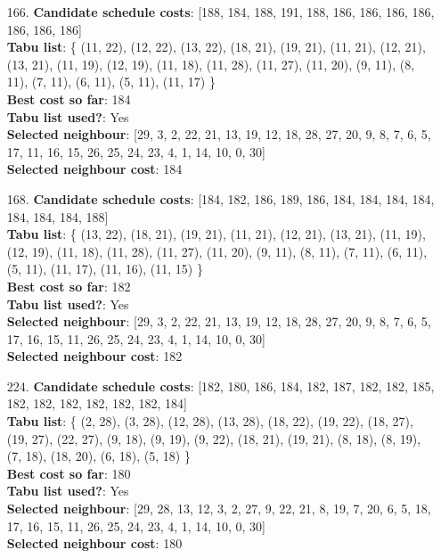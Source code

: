 \documentclass[fleqn]{article}
\begin{document}
\begin{itemize}
    \item[166.] \textbf{Candidate schedule costs}: [188, 184, 188, 191, 188, 186, 186, 186, 186, 186, 186, 186] \\
    \textbf{Tabu list}: \{ (11, 22), (12, 22), (13, 22), (18, 21), (19, 21), (11, 21), (12, 21), (13, 21), (11, 19), (12, 19), (11, 18), (11, 28), (11, 27), (11, 20), (9, 11), (8, 11), (7, 11), (6, 11), (5, 11), (11, 17) \} \\
    \textbf{Best cost so far}: 184 \\
    \textbf{Tabu list used?}: Yes \\
    \textbf{Selected neighbour}: [29, 3, 2, 22, 21, 13, 19, 12, 18, 28, 27, 20, 9, 8, 7, 6, 5, 17, 11, 16, 15, 26, 25, 24, 23, 4, 1, 14, 10, 0, 30] \\
    \textbf{Selected neighbour cost}: 184
      

    \item[168.] \textbf{Candidate schedule costs}: [184, 182, 186, 189, 186, 184, 184, 184, 184, 184, 184, 184, 188] \\
    \textbf{Tabu list}: \{ (13, 22), (18, 21), (19, 21), (11, 21), (12, 21), (13, 21), (11, 19), (12, 19), (11, 18), (11, 28), (11, 27), (11, 20), (9, 11), (8, 11), (7, 11), (6, 11), (5, 11), (11, 17), (11, 16), (11, 15) \} \\
    \textbf{Best cost so far}: 182 \\
    \textbf{Tabu list used?}: Yes \\
    \textbf{Selected neighbour}: [29, 3, 2, 22, 21, 13, 19, 12, 18, 28, 27, 20, 9, 8, 7, 6, 5, 17, 16, 15, 11, 26, 25, 24, 23, 4, 1, 14, 10, 0, 30] \\
    \textbf{Selected neighbour cost}: 182
      

    \item[224.] \textbf{Candidate schedule costs}: [182, 180, 186, 184, 182, 187, 182, 182, 185, 182, 182, 182, 182, 182, 182, 184] \\
    \textbf{Tabu list}: \{ (2, 28), (3, 28), (12, 28), (13, 28), (18, 22), (19, 22), (18, 27), (19, 27), (22, 27), (9, 18), (9, 19), (9, 22), (18, 21), (19, 21), (8, 18), (8, 19), (7, 18), (18, 20), (6, 18), (5, 18) \} \\
    \textbf{Best cost so far}: 180 \\
    \textbf{Tabu list used?}: Yes \\
    \textbf{Selected neighbour}: [29, 28, 13, 12, 3, 2, 27, 9, 22, 21, 8, 19, 7, 20, 6, 5, 18, 17, 16, 15, 11, 26, 25, 24, 23, 4, 1, 14, 10, 0, 30] \\
    \textbf{Selected neighbour cost}: 180
      


\end{itemize}
\end{document}
